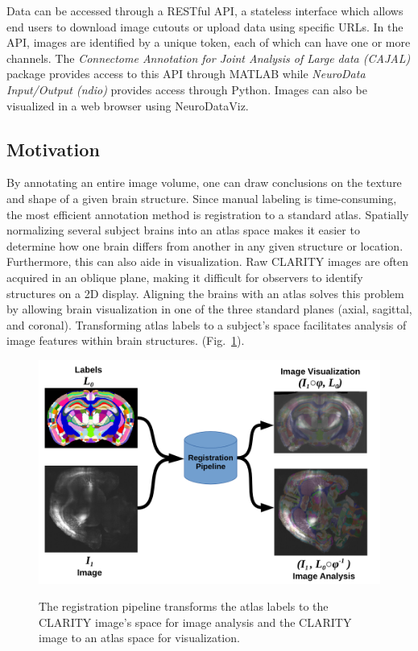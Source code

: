 \documentclass[]{spie}  %
\begin{document}
Data can be accessed through a RESTful API, a stateless interface which allows end users to download image cutouts or upload data using specific URLs.
%
%
%
In the API, images are identified by a unique token, each of which can have one or more channels.\cite{Burns13}
The \emph{Connectome Annotation for Joint Analysis of Large data (CAJAL)} package provides access to this API through MATLAB \cite{GrayRoncal} while \emph{NeuroData Input/Output (ndio)} provides access through Python.
Images can also be visualized in a web browser using NeuroDataViz.

\subsection{Motivation}
By annotating an entire image volume, one can draw conclusions on the texture and shape of a given brain structure.
Since manual labeling is time-consuming, the most efficient annotation method is registration to a standard atlas.
Spatially normalizing several subject brains into an atlas space makes it easier to determine how one brain differs from another in any given structure or location.
Furthermore, this can also aide in visualization.
Raw CLARITY images are often acquired in an oblique plane, making it difficult for observers to identify structures on a 2D display.
Aligning the brains with an atlas solves this problem by allowing brain visualization in one of the three standard planes (axial, sagittal, and coronal).
Transforming atlas labels to a subject's space facilitates analysis of image features within brain structures. (Fig.~\ref{fig:workflow}).

\begin{figure}[t]
 \begin{center}
  \includegraphics[width=\textwidth]{workflow} \\
 \end{center}
 \caption{The registration pipeline transforms the atlas labels to the CLARITY image's space for image analysis and the CLARITY image to an atlas space for visualization.}
 \label{fig:workflow}
\end{figure}
\end{document}
